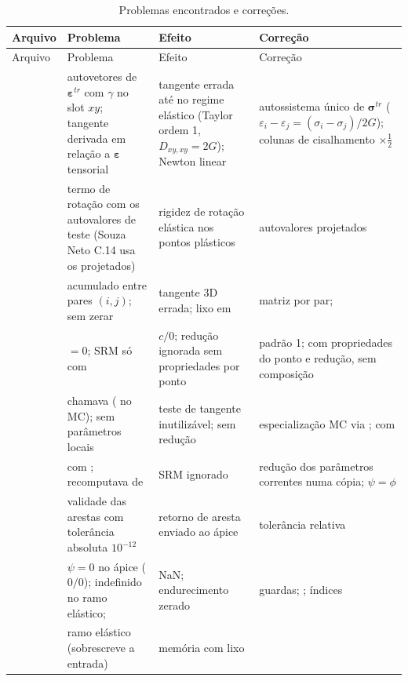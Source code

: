 \documentclass[11pt,a4paper]{article}
\newcommand{\sig}{\bm{\sigma}}
\newcommand{\eps}{\bm{\varepsilon}}
\begin{document}
{\footnotesize
\begin{longtable}{@{}L{3.0cm}L{4.5cm}L{3.3cm}L{4.4cm}@{}}
\caption{Problemas encontrados e correções.}\label{tab:bugs}\\
\toprule
Arquivo & Problema & Efeito & Correção\\
\midrule\endfirsthead
\toprule
Arquivo & Problema & Efeito & Correção\\
\midrule\endhead
{} & autovetores de $\eps^{tr}$ com $\gamma$ no slot $xy$; tangente derivada em relação a $\eps$ tensorial & tangente errada até no regime elástico (Taylor ordem 1, $D_{xy,xy}=2G$); Newton linear & autossistema único de $\sig^{tr}$ ($\varepsilon_i-\varepsilon_j=(\sigma_i-\sigma_j)/2G$); colunas de cisalhamento $\times\tfrac12$\\
 & termo de rotação com os autovalores de teste (Souza Neto C.14 usa os projetados) & rigidez de rotação elástica nos pontos plásticos & autovalores projetados\\
 &  acumulado entre pares $(i,j)$;  sem zerar & tangente 3D errada; lixo em  & matriz por par; \\
 &  $=0$; SRM só com  & $c/0$; redução ignorada sem propriedades por ponto & padrão 1;  com propriedades do ponto e redução, sem composição\\
 &  chamava  ( no MC);  sem parâmetros locais & teste de tangente inutilizável;  sem redução & especialização MC via ;  com \\
 &  com ;  recomputava de  & SRM ignorado & redução dos parâmetros correntes numa cópia; $\psi=\phi$\\
 & validade das arestas com tolerância absoluta $10^{-12}$ & retorno de aresta enviado ao ápice & tolerância relativa\\
 & $\psi=0$ no ápice ($0/0$);  indefinido no ramo elástico;  & NaN; endurecimento zerado & guardas; ; índices\\
 & ramo elástico  (sobrescreve a entrada) & memória com lixo & \\

\end{longtable}}
\end{document}
